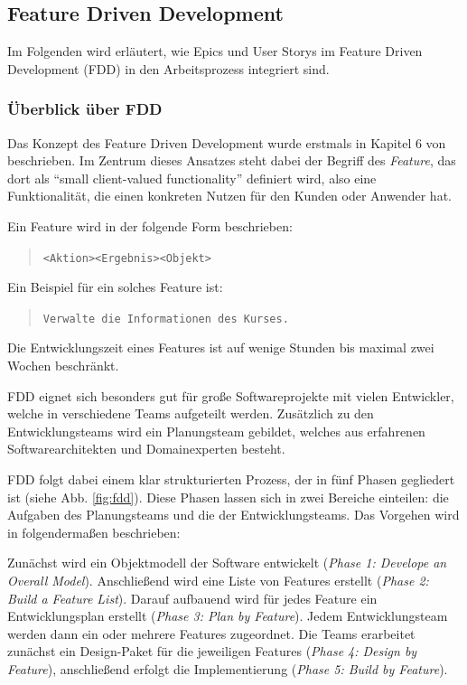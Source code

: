 \documentclass[acmtog]{acmart}
\begin{document}
\subsection{Feature Driven Development}
Im Folgenden wird erläutert, wie Epics und User Storys im Feature Driven Development (FDD) in den Arbeitsprozess integriert sind.

\subsubsection{Überblick über FDD}
Das Konzept des Feature Driven Development wurde erstmals in Kapitel 6 von \cite{coad99} beschrieben.
Im Zentrum dieses Ansatzes steht dabei der Begriff des \emph{Feature}, das dort als ``small client-valued functionality'' definiert wird, also eine Funktionalität, die einen konkreten Nutzen für den Kunden oder Anwender hat.

Ein Feature wird in der folgende Form beschrieben:

\begin{quote}
	\texttt{<Aktion>\hspace{5ex}<Ergebnis>\hspace{5ex}<Objekt>}
\end{quote}

Ein Beispiel für ein solches Feature ist:

\begin{quote}
	\texttt{Verwalte die Informationen des Kurses.}
\end{quote}

Die Entwicklungszeit eines Features ist auf wenige Stunden bis maximal zwei Wochen beschränkt.

FDD eignet sich besonders gut für große Softwareprojekte mit vielen Entwickler, welche in verschiedene Teams aufgeteilt werden.
Zusätzlich zu den Entwicklungsteams wird ein Planungsteam gebildet, welches aus erfahrenen Softwarearchitekten und Domainexperten besteht.

FDD folgt dabei einem klar strukturierten Prozess, der in fünf Phasen gegliedert ist (siehe Abb. \ref{fig:fdd}). Diese Phasen lassen sich in zwei Bereiche einteilen: die Aufgaben des Planungsteams und die der Entwicklungsteams. Das Vorgehen wird in \cite{coad99} folgendermaßen beschrieben:

Zunächst wird ein Objektmodell der Software entwickelt (\emph{Phase 1: Develope an Overall Model}).
Anschließend wird eine Liste von Features erstellt (\emph{Phase 2: Build a Feature List}).
Darauf aufbauend wird für jedes Feature ein Entwicklungsplan erstellt (\emph{Phase 3: Plan by Feature}).
Jedem Entwicklungsteam werden dann ein oder mehrere Features zugeordnet.
Die Teams erarbeitet zunächst ein Design-Paket für die jeweiligen Features (\emph{Phase 4: Design by Feature}),
anschließend erfolgt die Implementierung (\emph{Phase 5: Build by Feature}).
\end{document}
